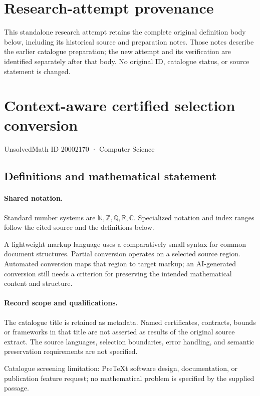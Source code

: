 \documentclass[11pt]{article}
\begin{document}
\section*{Research-attempt provenance}
This standalone research attempt retains the complete original definition body below,
including its historical source and preparation notes. Those notes describe the
earlier catalogue preparation; the new attempt and its verification are identified
separately after that body. No original ID, catalogue status, or source statement is changed.

\section{Context-aware certified selection conversion}\label{20002170}
{\small UnsolvedMath ID 20002170 · Computer Science}
\subsection{Definitions and mathematical statement}

\paragraph{Shared notation.}Standard number systems are $\mathbb N,\mathbb Z,\mathbb Q,\mathbb R,\mathbb C$. Specialized notation and index ranges follow the cited source and the definitions below.


A lightweight markup language uses a comparatively small syntax for common document structures. Partial conversion operates on a selected source region. Automated conversion maps that region to target markup; an AI-generated conversion still needs a criterion for preserving the intended mathematical content and structure.
\paragraph{Record scope and qualifications.}
The catalogue title is retained as metadata. Named certificates, contracts, bounds or frameworks in that title are not asserted as results of the original source extract.
The source languages, selection boundaries, error handling, and semantic preservation requirements are not specified.

Catalogue screening limitation: PreTeXt software design, documentation, or publication feature request; no mathematical problem is specified by the supplied passage.
\end{document}
